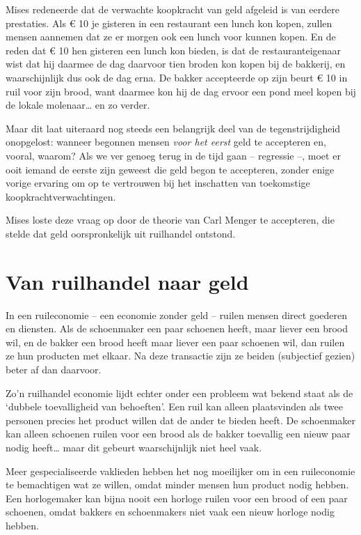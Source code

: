 \documentclass[smalldemyvopaper,11pt,twoside,onecolumn,openright,extrafontsizes,hidelinks]{memoir}
\begin{document}
Mises redeneerde dat de verwachte koopkracht van geld afgeleid is van
eerdere prestaties. Als € 10 je gisteren in een restaurant een lunch kon
kopen, zullen mensen aannemen dat ze er morgen ook een lunch voor kunnen
kopen. En de reden dat € 10 hen gisteren een lunch kon bieden, is dat de
restauranteigenaar wist dat hij daarmee de dag daarvoor tien broden kon
kopen bij de bakkerij, en waarschijnlijk dus ook de dag erna. De bakker
accepteerde op zijn beurt € 10 in ruil voor zijn brood, want daarmee kon
hij de dag ervoor een pond meel kopen bij de lokale molenaar\ldots{} en
zo verder.

Maar dit laat uiteraard nog steeds een belangrijk deel van de
tegenstrijdigheid onopgelost: wanneer begonnen mensen \emph{voor het
eerst} geld te accepteren en, vooral, waarom? Als we ver genoeg terug in
de tijd gaan -- regressie --, moet er ooit iemand de eerste zijn geweest
die geld begon te accepteren, zonder enige vorige ervaring om op te
vertrouwen bij het inschatten van toekomstige koopkrachtverwachtingen.

Mises loste deze vraag op door de theorie van Carl Menger te accepteren,
die stelde dat geld oorspronkelijk uit ruilhandel ontstond.

\section{Van ruilhandel naar geld}\label{van-ruilhandel-naar-geld}

In een ruileconomie -- een economie zonder geld -- ruilen mensen direct
goederen en diensten. Als de schoenmaker een paar schoenen heeft, maar
liever een brood wil, en de bakker een brood heeft maar liever een paar
schoenen wil, dan ruilen ze hun producten met elkaar. Na deze transactie
zijn ze beiden (subjectief gezien) beter af dan daarvoor.

Zo'n ruilhandel economie lijdt echter onder een probleem wat bekend
staat als de `dubbele toevalligheid van behoeften'. Een ruil kan alleen
plaatsvinden als twee personen precies het product willen dat de ander
te bieden heeft. De schoenmaker kan alleen schoenen ruilen voor een
brood als de bakker toevallig een nieuw paar nodig heeft\ldots{} maar
dit gebeurt waarschijnlijk niet heel vaak.

Meer gespecialiseerde vaklieden hebben het nog moeilijker om in een
ruileconomie te bemachtigen wat ze willen, omdat minder mensen hun
product nodig hebben. Een horlogemaker kan bijna nooit een horloge
ruilen voor een brood of een paar schoenen, omdat bakkers en
schoenmakers niet vaak een nieuw horloge nodig hebben.
\end{document}
